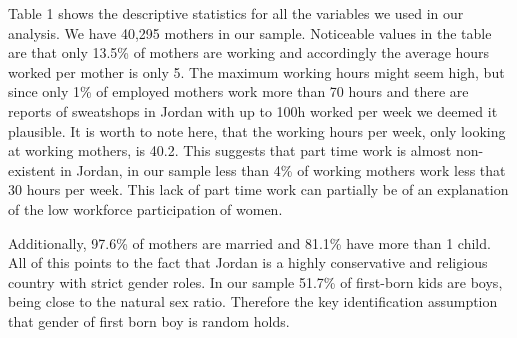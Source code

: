 \documentclass[12pt,draft,a4paper]{article}
\begin{document}
Table 1 shows the descriptive statistics for all the variables we used in our analysis. We have 40,295 mothers in our sample.
Noticeable values in the table are that only 13.5\% of mothers are working and accordingly the average hours worked per mother is only 5.
The maximum working hours might seem high,
but since only 1\% of employed mothers work more than 70 hours and there are reports of sweatshops in Jordan with up to 100h worked per week \citep{NYT06} we deemed it plausible.
It is worth to note here, that the working hours per week, only looking at working mothers, is 40.2.
This suggests that part time work is almost non-existent in Jordan, in our sample less than 4\% of working mothers work less that 30 hours per week.
This lack of part time work can partially be of an explanation of the low workforce participation of women. 

Additionally, 97.6\% of mothers are married and 81.1\% have more than 1 child.
All of this points to the fact that Jordan is a highly conservative and religious country with strict gender roles.
In our sample 51.7\% of first-born kids are boys, being close to the natural sex ratio. Therefore the key identification assumption that gender of first born boy is random holds.
    
\end{document}
